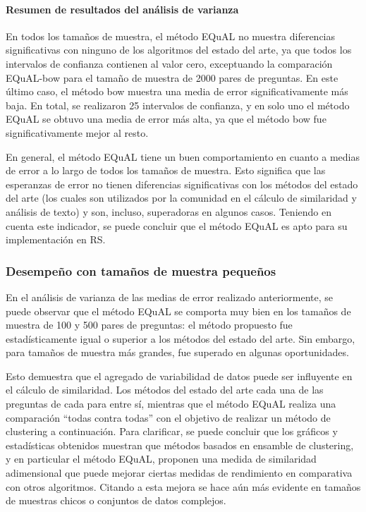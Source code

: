 \bigskip
\paragraph{Resumen de resultados del análisis de varianza}
En todos los tamaños de muestra, el método EQuAL no muestra diferencias significativas con ninguno de los algoritmos del estado del arte, ya que todos los intervalos de confianza contienen al valor cero, exceptuando la comparación EQuAL-bow para el tamaño de muestra de 2000 pares de preguntas. En este último caso, el método bow muestra una media de error significativamente más baja. En total, se realizaron 25 intervalos de confianza, y en solo uno el método EQuAL se obtuvo una media de error más alta, ya que el método bow fue significativamente mejor al resto.

\bigskip En general, el método EQuAL tiene un buen comportamiento en cuanto a medias de error a lo largo de todos los tamaños de muestra. Esto significa que las esperanzas de error no tienen diferencias significativas con los métodos del estado del arte (los cuales son utilizados por la comunidad en el cálculo de similaridad y análisis de texto) y son, incluso, superadoras en algunos casos. Teniendo en cuenta este indicador, se puede concluir que el método EQuAL es apto para su implementación en RS.

\subsubsection{Desempeño con tamaños de muestra pequeños}
En el análisis de varianza de las medias de error realizado anteriormente, se puede observar que el método EQuAL se comporta muy bien en los tamaños de muestra de 100 y 500 pares de preguntas: el método propuesto fue estadísticamente igual o superior a los métodos del estado del arte. Sin embargo, para tamaños de muestra más grandes, fue superado en algunas oportunidades.

\bigskip Esto demuestra que el agregado de variabilidad de datos puede ser influyente en el cálculo de similaridad. Los métodos del estado del arte cada una de las preguntas de cada para entre sí, mientras que el método EQuAL realiza una comparación “todas contra todas” con el objetivo de realizar un método de clustering a continuación. Para clarificar, se puede concluir que los gráficos y estadísticas obtenidos muestran que métodos basados en ensamble de clustering, y en particular el método EQuAL, proponen una medida de similaridad adimensional que puede mejorar ciertas medidas de rendimiento en comparativa con otros algoritmos. Citando a \cite{fred2005combining} esta mejora se hace aún más evidente en tamaños de muestras chicos o conjuntos de datos complejos.

